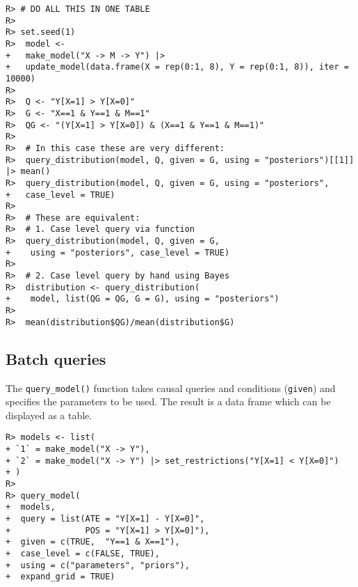 \documentclass[
  11pt,
  article]{jss}
\begin{document}
\begin{verbatim}
R> # DO ALL THIS IN ONE TABLE
R> 
R> set.seed(1)
R>  model <-
+   make_model("X -> M -> Y") |>
+   update_model(data.frame(X = rep(0:1, 8), Y = rep(0:1, 8)), iter = 10000)
R> 
R>  Q <- "Y[X=1] > Y[X=0]"
R>  G <- "X==1 & Y==1 & M==1"
R>  QG <- "(Y[X=1] > Y[X=0]) & (X==1 & Y==1 & M==1)"
R> 
R>  # In this case these are very different:
R>  query_distribution(model, Q, given = G, using = "posteriors")[[1]] |> mean()
R>  query_distribution(model, Q, given = G, using = "posteriors",
+   case_level = TRUE)
R> 
R>  # These are equivalent:
R>  # 1. Case level query via function
R>  query_distribution(model, Q, given = G,
+    using = "posteriors", case_level = TRUE)
R> 
R>  # 2. Case level query by hand using Bayes
R>  distribution <- query_distribution(
+    model, list(QG = QG, G = G), using = "posteriors")
R> 
R>  mean(distribution$QG)/mean(distribution$G)
\end{verbatim}

\hypertarget{batch-queries}{%
\subsection{Batch queries}\label{batch-queries}}

The \texttt{query\_model()} function takes causal queries and conditions
(\texttt{given}) and specifies the parameters to be used. The result is
a data frame which can be displayed as a table.

\begin{verbatim}
R> models <- list(
+ `1` = make_model("X -> Y"),
+ `2` = make_model("X -> Y") |> set_restrictions("Y[X=1] < Y[X=0]")
+ )
R> 
R> query_model(
+  models,
+  query = list(ATE = "Y[X=1] - Y[X=0]", 
+               POS = "Y[X=1] > Y[X=0]"),
+  given = c(TRUE,  "Y==1 & X==1"),
+  case_level = c(FALSE, TRUE),
+  using = c("parameters", "priors"),
+  expand_grid = TRUE)
\end{verbatim}
\end{document}
